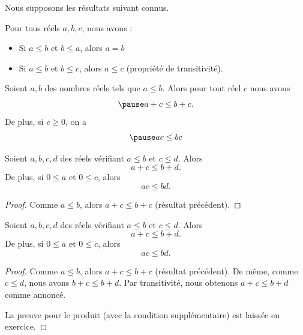 \documentclass[french,xcolor=svgnames]{beamer}
\begin{document}
\begin{frame}
  Nous supposons les résultats suivant connus.
  \begin{property}%
    Pour tous réels \(a,b,c\), nous avons :\pause{}
    \begin{itemize}
    \item Si \(a \leq b\) et \(b \leq a\), alors \(a = b\)\pause{}
    \item Si \(a \leq b\) et \(b \leq c\), alors \(a \leq c\) (propriété de transitivité).
    \end{itemize}
  \end{property}\pause{}
  \begin{property}%
    Soient \(a,b\) des nombres réels tels que \(a \leq b\).\pause{} Alors pour tout réel \(c\) nous avons
    \begin{equation*}\pause
      a + c \leq b + c.
    \end{equation*}
    De plus, si \(c \geq 0\), on a
    \begin{equation*}\pause
      ac \leq bc
    \end{equation*}
  \end{property}
\end{frame}
\begin{frame}%
  \begin{proposition}
    Soient \(a,b,c,d\) des réels vérifiant \(a \leq b\) et \(c \leq d\).\pause{} Alors
    \begin{equation*}
      a+c \leq b+d.
    \end{equation*}\pause{}
    De plus, si \(0 \leq a\) et \(0 \leq c\), alors\pause{}
    \begin{equation*}
      ac \leq bd.
    \end{equation*}
  \end{proposition}
  \begin{proof}
    Comme \(a \leq b\), alors \(a + c \leq b + c\) (résultat précédent).\noqed
  \end{proof}
\end{frame}
\begin{frame}
  \begin{proposition}\label{prop:inegalites}
    Soient \(a,b,c,d\) des réels vérifiant \(a \leq b\) et \(c \leq d\).\pause{} Alors
    \begin{equation*}
      a+c \leq b+d.
    \end{equation*}\pause{}
    De plus, si \(0 \leq a\) et \(0 \leq c\), alors\pause{}
    \begin{equation*}
      ac \leq bd.
    \end{equation*}
  \end{proposition}
  \begin{proof}
    Comme \(a \leq b\), alors \(a + c \leq b + c\) (résultat précédent).\pause{} De même, comme \(c \leq d\), nous avons \(b + c \leq b + d\).\pause{} Par transitivité, nous obtenons \(a + c \leq b + d\) comme annoncé.\pause{}

    La preuve pour le produit (avec la condition supplémentaire) est laissée en exercice.
  \end{proof}
\end{frame}
\end{document}
